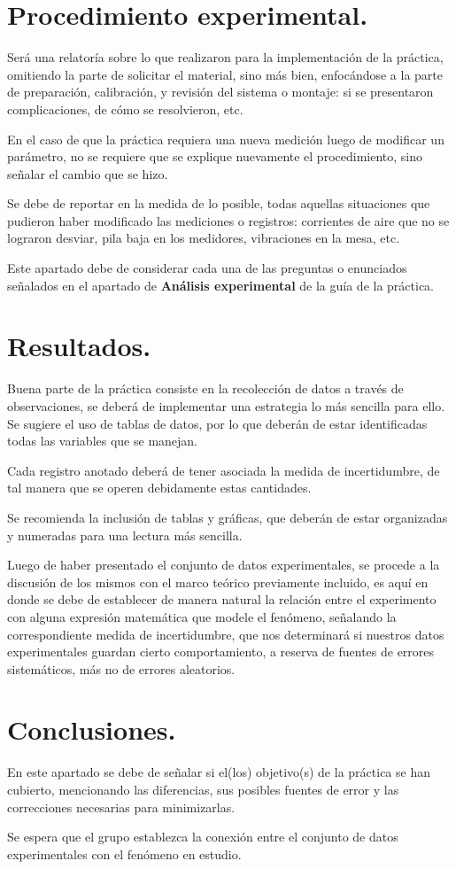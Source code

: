 \section{Procedimiento experimental.}
Será una relatoría sobre lo que realizaron para la implementación de la práctica, omitiendo la parte de solicitar el material, sino más bien, enfocándose a la parte de preparación, calibración, y revisión del sistema o montaje: si se presentaron complicaciones, de cómo se resolvieron, etc.
\par
En el caso de que la práctica requiera una nueva medición luego de modificar un parámetro, no se requiere que se explique nuevamente el procedimiento, sino señalar el cambio que se hizo.
\par
Se debe de reportar en la medida de lo posible, todas aquellas situaciones que pudieron haber modificado las mediciones o registros: corrientes de aire que no se lograron desviar, pila baja en los medidores, vibraciones en la mesa, etc.
\par
Este apartado debe de considerar cada una de las preguntas o enunciados señalados en el apartado de \textbf{Análisis experimental} de la guía de la práctica.
\section{Resultados.}
Buena parte de la práctica consiste en la recolección de datos a través de observaciones, se deberá de implementar una estrategia lo más sencilla para ello. Se sugiere el uso de tablas de datos, por lo que deberán de estar identificadas todas las variables que se manejan.
\par
Cada registro anotado deberá de tener asociada la medida de incertidumbre, de tal manera que se operen debidamente estas cantidades.
\par
Se recomienda la inclusión de tablas y gráficas, que deberán de estar organizadas y numeradas para una lectura más sencilla.
\par
Luego de haber presentado el conjunto de datos experimentales, se procede a la discusión de los mismos con el marco teórico previamente incluido, es aquí en donde se debe de establecer de manera natural la relación entre el experimento con alguna expresión matemática que modele el fenómeno, señalando la correspondiente medida de incertidumbre, que nos determinará si nuestros datos experimentales guardan cierto comportamiento, a reserva de fuentes de errores sistemáticos, más no de errores aleatorios.
\section{Conclusiones.}
En este apartado se debe de señalar si el(los) objetivo(s) de la práctica se han cubierto, mencionando las diferencias, sus posibles fuentes de error y las correcciones necesarias para minimizarlas.
\par
Se espera que el grupo establezca la conexión entre el conjunto de datos experimentales con el fenómeno en estudio.
